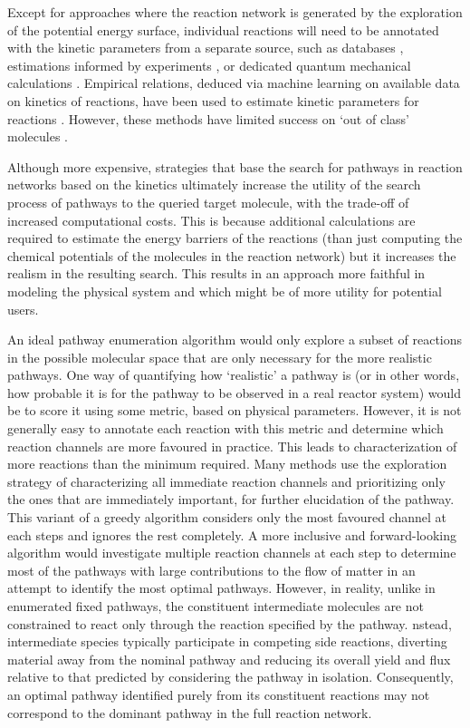 Except for approaches where the reaction network is generated by the exploration of the potential energy surface, individual reactions will need to be annotated with the kinetic parameters from a separate source, such as databases \cite{database_energy_barriers}, estimations informed by experiments \cite{reported_network}, or dedicated quantum mechanical calculations \cite{CRN_qm}.
Empirical relations, deduced via machine learning on available data on kinetics of reactions, have been used to estimate kinetic parameters for reactions \cite{ml_energy_barrier,ml_energy_barrier2,ml_energy_barrier3,ml_energy_barrier4,ml_energy_barrier6,ml_reaction_barrier7}. However, these methods have limited success on `out of class' molecules \cite{scaling_limitations}. 

Although more expensive, strategies that base the search for pathways in reaction networks based on the kinetics ultimately increase the utility of the search process of pathways to the queried target molecule, with the trade-off of increased computational costs. This is because additional calculations are required to estimate the energy barriers of the reactions (than just computing the chemical potentials of the molecules in the reaction network) but it increases the realism in the resulting search. This results in an approach more faithful in modeling the physical system and which might be of more utility for potential users.

An ideal pathway enumeration algorithm would only explore a subset of reactions in the possible molecular space that are only necessary for the more realistic pathways. One way of quantifying how `realistic' a pathway is (or in other words, how probable it is for the pathway to be observed in a real reactor system) would be to score it using some metric, based on physical parameters. However, it is not generally easy to annotate each reaction with this metric and determine which reaction channels are more favoured in practice. This leads to characterization of more reactions than the minimum required. Many methods use the exploration strategy of characterizing all immediate reaction channels and prioritizing only the ones that are immediately important, for further elucidation of the pathway. This variant of a greedy algorithm considers only the most favoured channel at each steps and ignores the rest completely. A more inclusive and forward-looking algorithm would investigate multiple reaction channels at each step to determine most of the pathways with large contributions to the flow of matter in an attempt to identify the most optimal pathways. However, in reality, unlike in enumerated fixed pathways, the constituent intermediate molecules are not constrained to react only through the reaction specified by the pathway. nstead, intermediate species typically participate in competing side reactions, diverting material away from the nominal pathway and reducing its overall yield and flux relative to that predicted by considering the pathway in isolation. Consequently, an optimal pathway identified purely from its constituent reactions may not correspond to the dominant pathway in the full reaction network.

